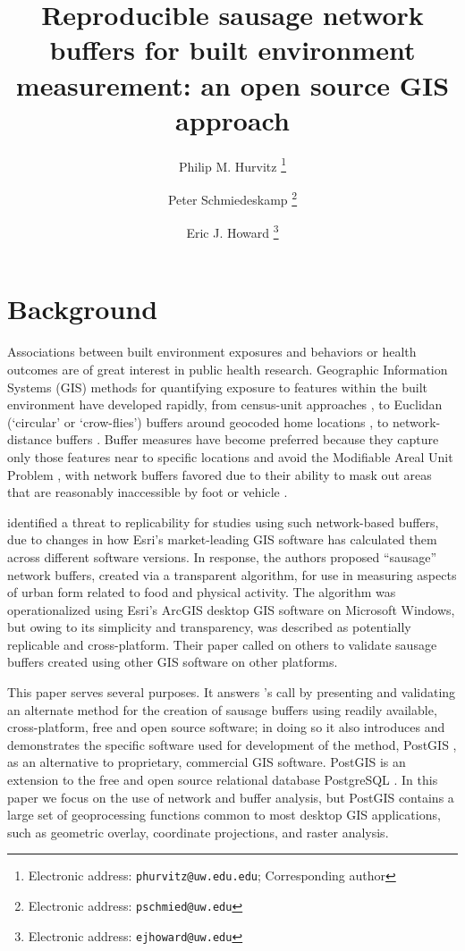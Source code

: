 \documentclass[11pt,letterpaper]{article} %
\title{Reproducible sausage network buffers for built environment measurement: an open source GIS approach}
\author{Philip M. Hurvitz%
  \thanks{Electronic address: \texttt{phurvitz@uw.edu.edu}; Corresponding author}}
\author{Peter Schmiedeskamp%
  \thanks{Electronic address: \texttt{pschmied@uw.edu}}}
\author{Eric J. Howard%
  \thanks{Electronic address: \texttt{ejhoward@uw.edu}}}
\affil{Department of Urban Design and Planning, University of Washington}
\date{}
\begin{document}
\maketitle

\section*{Background}
Associations between built environment exposures and behaviors or health outcomes are of great interest in public health research. Geographic Information Systems (GIS) methods for quantifying exposure to features within the built environment have developed rapidly, from census-unit approaches \parencite{Morland2002a}, to Euclidan (`circular' or `crow-flies') buffers around geocoded home locations \parencite{Moudon2002}, to network-distance buffers \parencite{Frank2005}. Buffer measures have become preferred because they capture only those features near to specific locations and avoid the Modifiable Areal Unit Problem \parencite{Openshaw1984}, with network buffers favored due to their ability to mask out areas that are reasonably inaccessible by foot or vehicle \parencite{Oliver2007}. 

\textcite{Forsyth2014sausage}
identified a threat to replicability for studies using such
network-based buffers, due to changes in how Esri's
market-leading GIS software has calculated them across different software versions. In response,
the authors proposed ``sausage'' network buffers,
created via a transparent algorithm, for use in measuring aspects of
urban form related to food and physical activity. The algorithm was operationalized using Esri's ArcGIS desktop GIS software on Microsoft Windows, but owing to its simplicity and transparency, was described as potentially 
replicable and cross-platform. Their paper called on others to validate sausage buffers
created using other GIS software on other platforms. 

This paper serves several purposes. It answers \citeauthor{Forsyth2014sausage}'s call by presenting and validating an alternate method for the creation of sausage buffers using readily available, cross-platform, free and open source software; in doing so it also introduces and demonstrates the specific software used for development of the method, PostGIS \parencite{ThePostGISDevelopmentGroup2008}, as an alternative to proprietary, commercial GIS software. PostGIS is an extension to the free and open source relational database PostgreSQL \parencite{ThePostgreSQLGlobalDevelopmentGroup2008}. In this paper we focus on the use of network and buffer analysis, but PostGIS contains a large set of geoprocessing functions common to most desktop GIS applications, such as geometric overlay, coordinate projections, and raster analysis.
\end{document}
